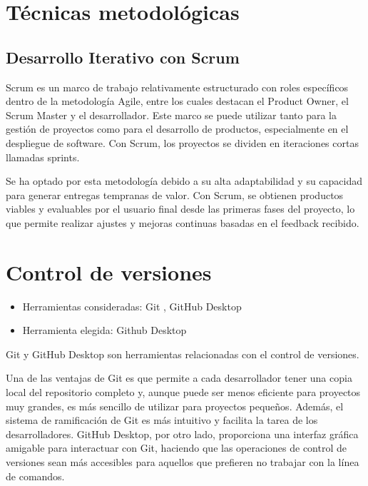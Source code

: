 
\section{Técnicas metodológicas}\label{metodologias}

\subsection{Desarrollo Iterativo con Scrum}\label{scrum}
Scrum es un marco de trabajo relativamente estructurado con roles específicos dentro de la metodología Agile, entre los cuales destacan el Product Owner, el Scrum Master y el desarrollador. Este marco se puede utilizar tanto para la gestión de proyectos como para el desarrollo de productos, especialmente en el despliegue de software. Con Scrum, los proyectos se dividen en iteraciones cortas llamadas sprints.

Se ha optado por esta metodología debido a su alta adaptabilidad y su capacidad para generar entregas tempranas de valor. Con Scrum, se obtienen productos viables y evaluables por el usuario final desde las primeras fases del proyecto, lo que permite realizar ajustes y mejoras continuas basadas en el feedback recibido.


\section{Control de versiones}\label{control_versiones}
\begin{itemize}
\item  
Herramientas consideradas: Git \citep{online:git}, GitHub Desktop \citep{online:githubdesktop}
\item
  Herramienta elegida: Github Desktop
\end{itemize}
Git y GitHub Desktop son herramientas relacionadas con el control de versiones.

Una de las ventajas de Git es que permite a cada desarrollador tener una copia local del repositorio completo y, aunque puede ser menos eficiente para proyectos muy grandes, es más sencillo de utilizar para proyectos pequeños. Además, el sistema de ramificación de Git es más intuitivo y facilita la tarea de los desarrolladores. GitHub Desktop, por otro lado, proporciona una interfaz gráfica amigable para interactuar con Git, haciendo que las operaciones de control de versiones sean más accesibles para aquellos que prefieren no trabajar con la línea de comandos.

